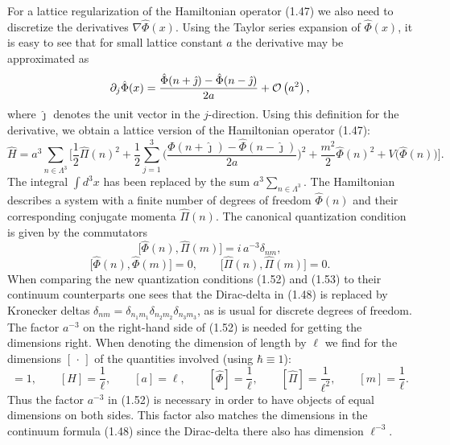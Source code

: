 For a lattice regularization of the Hamiltonian operator (1.47) we also need
to discretize the derivatives $\nabla\hat{\Phi}(x)$. Using the Taylor series
expansion of $\hat{\Phi}(x)$, it is easy to see that for small lattice constant
$a$ the derivative may be approximated as
\begin{equation}
  \partial_j\hat{\Phi}(x)
  = \frac{\hat{\Phi}(n+\hat{\jmath}) - \hat{\Phi}(n-\hat{\jmath})}{2a}
    + \mathcal{O}\left(a^2\right),
\end{equation}
where $\hat{\jmath}$ denotes the unit vector in the $j$-direction. Using this
definition for the derivative, we obtain a lattice version of the Hamiltonian
operator (1.47):
\begin{equation}
  \hat{H} = a^3\sum_{n\in\Lambda^3}\Big[
    \frac{1}{2}\hat{\Pi}(n)^2
    + \frac{1}{2}\sum_{j=1}^3
      \Big(\frac{\hat{\Phi}(n+\hat{\jmath}) - \hat{\Phi}(n-\hat{\jmath})}{2a}\Big)^2
    + \frac{m^2}{2}\hat{\Phi}(n)^2 + V\big(\hat{\Phi}(n)\big)\Big].
\end{equation}
The integral $\int d^3x$ has been replaced by the sum
$a^3\sum_{n\in\Lambda^3}$. The Hamiltonian describes a system with a finite
number of degrees of freedom $\hat{\Phi}(n)$ and their corresponding conjugate
momenta $\hat{\Pi}(n)$. The canonical quantization condition is given by the
commutators
\begin{equation}
  \big[\hat{\Phi}(n), \hat{\Pi}(m)\big] = i\,a^{-3}\delta_{nm},
\end{equation}
\begin{equation}
  \big[\hat{\Phi}(n), \hat{\Phi}(m)\big] = 0, \qquad
  \big[\hat{\Pi}(n), \hat{\Pi}(m)\big] = 0.
\end{equation}
When comparing the new quantization conditions (1.52) and (1.53) to their
continuum counterparts one sees that the Dirac-delta in (1.48) is replaced by
Kronecker deltas $\delta_{nm} = \delta_{n_1 m_1}\delta_{n_2 m_2}\delta_{n_3 m_3}$,
as is usual for discrete degrees of freedom. The factor $a^{-3}$ on the
right-hand side of (1.52) is needed for getting the dimensions right. When
denoting the dimension of length by $\ell$ we find for the dimensions
$[\,\cdot\,]$ of the quantities involved (using $\hbar \equiv 1$):
\begin{equation}
  [S] = 1, \qquad [H] = \frac{1}{\ell}, \qquad [a] = \ell, \qquad
  [\hat{\Phi}] = \frac{1}{\ell}, \qquad [\hat{\Pi}] = \frac{1}{\ell^2}, \qquad
  [m] = \frac{1}{\ell}.
\end{equation}
Thus the factor $a^{-3}$ in (1.52) is necessary in order to have objects of
equal dimensions on both sides. This factor also matches the dimensions in the
continuum formula (1.48) since the Dirac-delta there also has dimension
$\ell^{-3}$.

